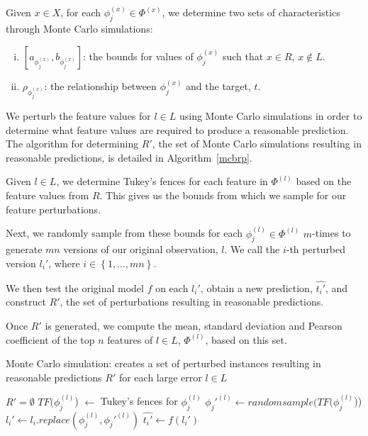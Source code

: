 Given $x \in X$, for each $\phi_j^{(x)} \in \Phi^{(x)}$, we determine two sets of characteristics through Monte Carlo simulations:
\begin{enumerate}[(i)]
 \item $[a_{\phi_j^{(x)}}, b_{\phi_j^{(x)}}]$: the bounds for values of $\phi_j^{(x)}$ such that $x \in R$, $x \not\in L$.
 \item $\rho_{\phi_j^{(x)}}$: the relationship between $\phi_j^{(x)}$ and the target, $t$.
\end{enumerate}
We perturb the feature values for $l \in L$ using Monte Carlo simulations in order to determine what feature values are required to produce a reasonable prediction. 
The algorithm for determining $R'$, the set of Monte Carlo simulations resulting in reasonable predictions, is detailed in Algorithm~\ref{mcbrp}.

Given $l \in L$, we determine Tukey's fences for each feature in $\Phi^{(l)}$ based on the feature values from $R$. 
This gives us the bounds from which we sample for our feature perturbations. 

Next, we randomly sample from these bounds for each $\phi_j^{(l)} \in \Phi^{(l)}$ $m$-times to generate $mn$ versions of our original observation, $l$. 
We call the $i$-th perturbed version $l_i'$, where $i \in \left\{1, \ldots, mn\right\}$. 

We then test the original model $f$ on each $l_i'$, obtain a new prediction, $\hat{t_i'}$, and construct $R'$, the set of perturbations resulting in reasonable predictions. 

Once $R'$ is generated, we compute the mean, standard deviation and Pearson coefficient \citep{swinscow-1997-stats} of the top $n$ features of $l \in L$, $\Phi^{(l)}$, based on this set. 
\bigskip
\begin{algorithm}[h]
    \caption{Monte Carlo simulation: creates a set of perturbed instances resulting in reasonable predictions $R'$ for each large error $l \in L$}
    \label{mcbrp}
    \begin{algorithmic}[1] 
        \State $R' = \emptyset$ 
                \State $TF(\phi_j^{(l)}$) $\gets$ Tukey's fences for $\phi_j^{(l)}$ 
                    \State $\phi_j'^{(l)} \gets randomsample(TF(\phi_j^{(l)}$))
                    \State $l_i' \gets l_i.replace(\phi_j^{(l)}, \phi_j'^{(l)})$              
                    \State $\hat{t_i'} \gets f(l_i')$  
                \EndFor
            \EndFor
    \end{algorithmic}
\end{algorithm}
\fi



